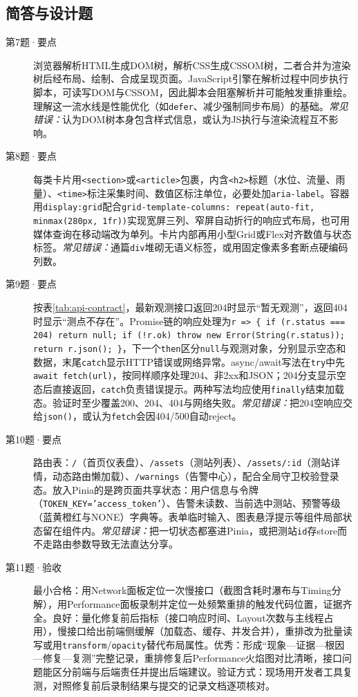 \subsection*{简答与设计题}
\begin{description}
  \item[第7题·要点] 浏览器解析HTML生成DOM树，解析CSS生成CSSOM树，二者合并为渲染树后经布局、绘制、合成呈现页面。JavaScript引擎在解析过程中同步执行脚本，可读写DOM与CSSOM，因此脚本会阻塞解析并可能触发重排重绘。理解这一流水线是性能优化（如\texttt{defer}、减少强制同步布局）的基础。\textit{常见错误：}认为DOM树本身包含样式信息，或认为JS执行与渲染流程互不影响。
  \item[第8题·要点] 每类卡片用\texttt{<section>}或\texttt{<article>}包裹，内含\texttt{<h2>}标题（水位、流量、雨量）、\texttt{<time>}标注采集时间、数值区标注单位，必要处加\texttt{aria-label}。容器用\texttt{display:grid}配合\texttt{grid-template-columns: repeat(auto-fit, minmax(280px, 1fr))}实现宽屏三列、窄屏自动折行的响应式布局，也可用媒体查询在移动端改为单列。卡片内部再用小型Grid或Flex对齐数值与状态标签。\textit{常见错误：}通篇\texttt{div}堆砌无语义标签，或用固定像素多套断点硬编码列数。
  \item[第9题·要点] 按表\ref{tab:api-contract}，最新观测接口返回204时显示“暂无观测”，返回404时显示“测点不存在”。Promise链的响应处理为\texttt{r => \{ if (r.status === 204) return null; if (!r.ok) throw new Error(String(r.status)); return r.json(); \}}，下一个\texttt{then}区分\texttt{null}与观测对象，分别显示空态和数据，末尾\texttt{catch}显示HTTP错误或网络异常。async/await写法在\texttt{try}中先\texttt{await fetch(url)}，按同样顺序处理204、非2xx和JSON；204分支显示空态后直接返回，\texttt{catch}负责错误提示。两种写法均应使用\texttt{finally}结束加载态。验证时至少覆盖200、204、404与网络失败。\textit{常见错误：}把204空响应交给\texttt{json()}，或认为\texttt{fetch}会因404/500自动reject。
  \item[第10题·要点] 路由表：\texttt{/}（首页仪表盘）、\texttt{/assets}（测站列表）、\texttt{/assets/:id}（测站详情，动态路由懒加载）、\texttt{/warnings}（告警中心），配合全局守卫校验登录态。放入Pinia的是跨页面共享状态：用户信息与令牌（\texttt{TOKEN\_KEY='access\_token'}）、告警未读数、当前选中测站、预警等级（蓝黄橙红与NONE）字典等。表单临时输入、图表悬浮提示等组件局部状态留在组件内。\textit{常见错误：}把一切状态都塞进Pinia，或把测站\texttt{id}存store而不走路由参数导致无法直达分享。
  \item[第11题·验收] 最小合格：用Network面板定位一次慢接口（截图含耗时瀑布与Timing分解），用Performance面板录制并定位一处频繁重排的触发代码位置，证据齐全。良好：量化修复前后指标（接口响应时间、Layout次数与主线程占用），慢接口给出前端侧缓解（加载态、缓存、并发合并），重排改为批量读写或用\texttt{transform}/\texttt{opacity}替代布局属性。优秀：形成“现象—证据—根因—修复—复测”完整记录，重排修复后Performance火焰图对比清晰，接口问题能区分前端与后端责任并提出后端建议。验证方式：现场用开发者工具复测，对照修复前后录制结果与提交的记录文档逐项核对。
\end{description}

